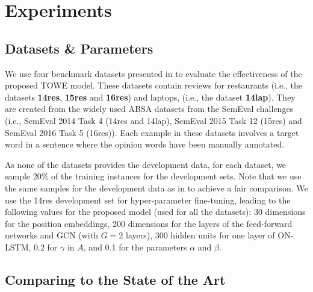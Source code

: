 \documentclass[11pt,a4paper]{article}
\begin{document}
\section{Experiments}
\subsection{Datasets \& Parameters}


We use four benchmark datasets presented in \citep{fan2019target} to evaluate the effectiveness of the proposed TOWE model. These datasets contain reviews for restaurants (i.e., the datasets {\bf 14res}, {\bf 15res} and {\bf 16res}) and laptops, (i.e., the dataset {\bf 14lap}). They are created from the widely used ABSA datasets from the SemEval challenges (i.e., SemEval 2014 Task 4 (14res and 14lap), SemEval 2015 Task 12 (15res) and SemEval 2016 Task 5 (16res)). Each example in these datasets involves a target word in a sentence where the opinion words have been manually annotated. 









As none of the datasets provides the development data, for each dataset, we sample 20\% of the training instances for the development sets. Note that we use the same samples for the development data as in \citep{fan2019target} to achieve a fair comparison. We use the 14res development set for hyper-parameter fine-tuning, leading to the following values for the proposed model (used for all the datasets): 30 dimensions for the position embeddings, 200 dimensions for the layers of the feed-forward networks and GCN (with $G=2$ layers), 300 hidden units for one layer of ON-LSTM, 0.2 for $\gamma$ in $A$, and 0.1 for the parameters $\alpha$ and $\beta$.











\subsection{Comparing to the State of the Art}
\end{document}
